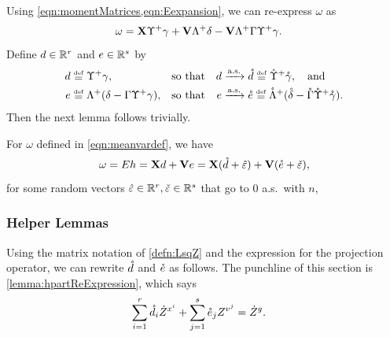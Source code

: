 \documentclass[main.tex]{subfiles}
\begin{document}
Using \cref{eqn:momentMatrices,eqn:Eexpansion}, we can re-express $\omega$ as
\begin{align*}
\omega
    &=
        \mathbf{X} \Upsilon ^+ \gamma
        + \mathbf{V} \Lambda ^+ \delta
        - \mathbf{V} \Lambda ^+ \Gamma \Upsilon ^+ \gamma
        .
\end{align*}
Define $d \in \mathbb{R}^r$ and $e \in \mathbb{R}^s$ by
\begin{equation}
  \begin{aligned}
    \dme &\defeq \Upsilonme ^+ \gammame,
        &\text{so that}&&
          \dme &\asto \mathring {\dme} \defeq \mathring{\Upsilonme }^+ \mathring{\gammame}, \quad\text{and}\\
    \eme &\defeq {\Lambdame }^+({\deltame} - \Gamma {\Upsilonme }^+ {\gammame}),
        &\text{so that}&&
          \eme &\asto \mathring {\eme} \defeq \mathring{\Lambdame }^+(\mathring{\deltame} - \mathring \Gamma \mathring{\Upsilonme }^+ \mathring{\gammame}).
  \end{aligned}
  \label{eqn:zetaeta}
\end{equation}
Then the next lemma follows trivially.
\begin{lemma}\label{lemma:omegaExpansion}
For $\omega$ defined in \cref{eqn:meanvardef}, we have
\[\omega = Eh = \mathbf{X} d + \mathbf{V} e = \mathbf{X}(\mathring {d} + \hat\varepsilon) + \mathbf{V} (\mathring {e} + \check\varepsilon),\]
for some random vectors $\hat\varepsilon \in \mathbb{R}^r, \check\varepsilon \in \mathbb{R}^s$ that go to 0 a.s.\ with $n$,
\end{lemma}

\subsubsection{Helper Lemmas}

Using the matrix notation of \cref{defn:LsqZ} and the expression for the projection operator, we can rewrite $\mathring{d}$ and $\mathring{e}$ as follows.
The punchline of this section is \cref{lemma:hpartReExpression}, which says
\begin{align*}
  \sum_{i=1}^r \mathring{d}_i \dot Z^{x^i}
  +
  \sum_{j=1}^s \mathring{e}_j  Z^{v^j}
    &=
    \dot Z^g.
\end{align*}
\end{document}
